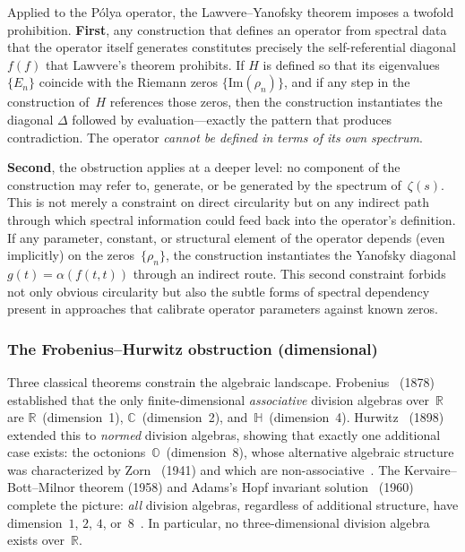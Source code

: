 Applied to the P\'olya operator, the Lawvere--Yanofsky theorem
imposes a twofold prohibition.  \textbf{First}, any construction that
defines an operator from spectral data that the operator itself
generates constitutes precisely the self-referential diagonal
$f(f)$ that Lawvere's theorem prohibits.  If $H$ is defined
so that its eigenvalues $\{E_n\}$ coincide with the Riemann zeros
$\{\mathrm{Im}(\rho_n)\}$, and if any step in the construction
of~$H$ references those zeros, then the construction instantiates the
diagonal $\Delta$ followed by evaluation---exactly the pattern that
produces contradiction.  The operator \emph{cannot be defined in terms
of its own spectrum}.

\textbf{Second}, the obstruction applies at a deeper level: no
component of the construction may refer to, generate, or be generated
by the spectrum of~$\zeta(s)$.  This is not merely a constraint on
direct circularity but on any indirect path through which spectral
information could feed back into the operator's definition.  If any
parameter, constant, or structural element of the operator depends
(even implicitly) on the zeros~$\{\rho_n\}$, the construction
instantiates the Yanofsky diagonal $g(t) = \alpha(f(t,t))$ through an
indirect route.  This second constraint forbids not only obvious
circularity but also the subtle forms of spectral dependency present
in approaches that calibrate operator parameters against known zeros.

\subsubsection{The Frobenius--Hurwitz obstruction
(dimensional)}\label{sssec:frobenius}

Three classical theorems constrain the algebraic landscape.
Frobenius~\cite{frobenius1878} (1878) established that the only finite-dimensional
\emph{associative} division algebras over~$\mathbb{R}$ are
$\mathbb{R}$~(dimension~1), $\mathbb{C}$~(dimension~2),
and~$\mathbb{H}$~(dimension~4).  Hurwitz~\cite{hurwitz98} (1898) extended this to
\emph{normed} division algebras, showing that exactly one additional
case exists: the octonions~$\mathbb{O}$~(dimension~8), whose alternative algebraic structure was characterized by Zorn~\cite{zorn41} (1941) and which are
non-associative~\cite[Theorem~1]{baez02}.  The
Kervaire--Bott--Milnor theorem (1958) and Adams's Hopf invariant solution~\cite{adams60} (1960) complete the picture: \emph{all}
division algebras, regardless of additional structure, have
dimension~$1$, $2$, $4$, or~$8$~\cite[Theorem~3]{baez02}.  In
particular, no three-dimensional division algebra exists over~$\mathbb{R}$.

